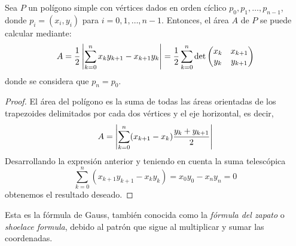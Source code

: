\documentclass[a4paper,12pt]{article}
\begin{document}
\begin{theorem}
    Sea $P$ un polígono simple con vértices dados en orden cíclico $p_0, p_1, \dots, p_{n-1}$, donde $p_i = (x_i, y_i)$ para $i = 0, 1, \dots, n-1$. Entonces, el área $A$ de $P$ se puede calcular mediante:
    $$A=\frac{1}{2}\left| \sum_{k=0}^nx_ky_{k+1} - x_{k+1}y_k\right|=\frac{1}{2}\sum_{k=0}^n\det\begin{pmatrix}
        x_k & x_{k+1} \\
        y_k & y_{k+1}
    \end{pmatrix}$$
    donde se considera que $p_n = p_0$.
\end{theorem}

\begin{proof}
    El área del polígono es la suma de todas las áreas orientadas de los trapezoides delimitados por cada dos vértices y el eje horizontal, es decir,
    $$A=\left| \sum_{k=0}^n(x_{k+1}-x_k)\frac{y_k+y_{k+1}}{2}\right|$$
    Desarrollando la expresión anterior y teniendo en cuenta la suma telescópica
    $$\sum_{k=0}^n(x_{k+1}y_{k+1}-x_ky_k)=x_0y_0-x_ny_n=0$$
    obtenemos el resultado deseado.
\end{proof}
Esta es la fórmula de Gauss, también conocida como la \textit{fórmula del zapato} o \textit{shoelace formula}, debido al patrón que sigue al multiplicar y sumar las coordenadas.
\end{document}

